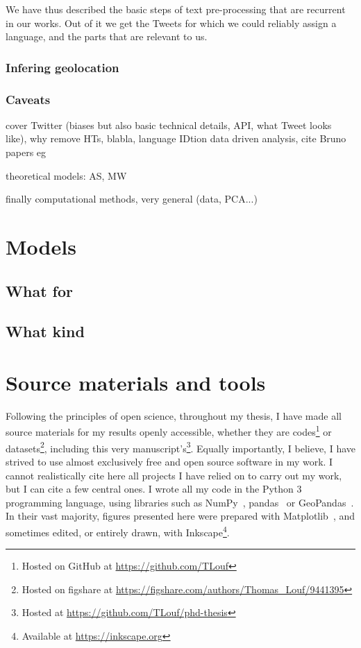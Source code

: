 \documentclass[../thesis.tex]{subfiles}
\begin{document}
We have thus described the basic steps of text pre-processing that are recurrent in our
works. Out of it we get the Tweets for which we could reliably assign a language, and
the parts that are relevant to us.



\subsubsection{Infering geolocation}

\subsubsection{Caveats}
cover Twitter (biases but also basic technical details, API, what Tweet looks like), why remove HTs, blabla, language IDtion data driven analysis, cite Bruno papers eg

theoretical models: AS, MW 

finally computational methods, very general (data, PCA...)


\section{Models}

\subsection{What for}

\subsection{What kind}



\section{Source materials and tools}
Following the principles of open science, throughout my thesis, I have made all source
materials for my results openly accessible, whether they are codes\footnote{Hosted on
GitHub at \url{https://github.com/TLouf}} or datasets\footnote{Hosted on figshare at
\url{https://figshare.com/authors/Thomas_Louf/9441395}}, including this very
manuscript's\footnote{Hosted at \url{https://github.com/TLouf/phd-thesis}}. Equally importantly, I believe, I have strived to use almost exclusively free
and open source software in my work. I cannot realistically cite here all projects I
have relied on to carry out my work, but I can cite a few central ones. I wrote all my
code in the Python 3 programming language, using libraries such as
NumPy~\cite{HarrisArrayProgramming2020},
pandas~\cite{teamPandasdevPandas2020} or
GeoPandas~\cite{JordahlGeopandasGeopandas2020}. In their vast majority, figures
presented here were prepared with Matplotlib~\cite{HunterMatplotlib2D2007}, and
sometimes edited, or entirely drawn, with Inkscape\footnote{Available at
\url{https://inkscape.org}}.
\end{document}
